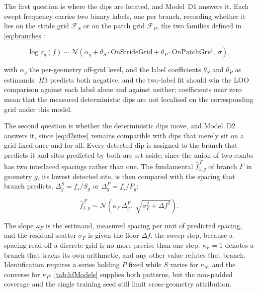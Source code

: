 The first question is where the dips are located, and Model~D1 answers it. Each swept frequency carries two binary labels, one per branch, recording whether it lies on the stride grid $\mathcal{F}_{S}$ or on the patch grid $\mathcal{F}_{P}$, the two families defined in \autoref{eq:branches}:

\begin{equation}
\label{eq:d2sites}
\log z_g(f) \sim \mathcal{N}\!\left(
\alpha_g + \theta_S \cdot \text{OnStrideGrid} + \theta_P \cdot \text{OnPatchGrid},\ \sigma
\right),
\end{equation}

with $\alpha_g$ the per-geometry off-grid level, and the label coefficients $\theta_S$ and $\theta_P$ as estimands. $H3$ predicts both negative, and the two-label fit should win the LOO comparison against each label alone and against neither; coefficients near zero mean that the measured deterministic dips are not localised on the corresponding grid under this model.

The second question is whether the deterministic dips move, and Model~D2 answers it, since \autoref{eq:d2sites} remains compatible with dips that merely sit on a grid fixed once and for all. Every detected dip is assigned to the branch that predicts it and sites predicted by both are set aside, since the union of two combs has two interlaced spacings rather than one. The fundamental $\hat f^{\,F}_{1,g}$ of branch $F$ in geometry $g$, its lowest detected site, is then compared with the spacing that branch predicts, $\Delta^S_g=f_s/S_g$ or $\Delta^P_g=f_s/P_g$:

\begin{equation}
\label{eq:d2move}
\hat f^{\,F}_{1,g} \sim \mathcal{N}\!\left(
\kappa_F \,\Delta^F_g,\ \sqrt{\sigma_F^2+\Delta f^2}
\right).
\end{equation}

The slope $\kappa_F$ is the estimand, measured spacing per unit of predicted spacing, and the residual scatter $\sigma_F$ is given the floor $\Delta f$, the sweep step, because a spacing read off a discrete grid is no more precise than one step. $\kappa_F=1$ denotes a branch that tracks its own arithmetic, and any other value refutes that branch. Identification requires a series holding $P$ fixed while $S$ varies for $\kappa_S$, and the converse for $\kappa_P$; \autoref{tab:hfModels} supplies both patterns, but the non-padded coverage and the single training seed still limit cross-geometry attribution.

